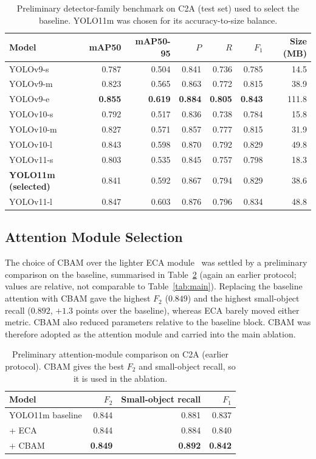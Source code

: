 \begin{table}[tbp]
  \centering
  \caption{Preliminary detector-family benchmark on C2A (test set) used to select
  the baseline. YOLO11m was chosen for its accuracy-to-size balance.}
  \label{tab:detbench}
  \setlength{\tabcolsep}{5pt}
  \begin{tabular}{@{}l r r r r r r@{}}
    \toprule
    Model & mAP50 & mAP50-95 & $P$ & $R$ & $F_1$ & Size (MB) \\
    \midrule
    YOLOv9-s   & 0.787 & 0.504 & 0.841 & 0.736 & 0.785 & 14.5 \\
    YOLOv9-m   & 0.823 & 0.565 & 0.863 & 0.772 & 0.815 & 38.9 \\
    YOLOv9-e   & \textbf{0.855} & \textbf{0.619} & \textbf{0.884} & \textbf{0.805} & \textbf{0.843} & 111.8 \\
    YOLOv10-s  & 0.792 & 0.517 & 0.836 & 0.738 & 0.784 & 15.8 \\
    YOLOv10-m  & 0.827 & 0.571 & 0.857 & 0.777 & 0.815 & 31.9 \\
    YOLOv10-l  & 0.843 & 0.598 & 0.870 & 0.792 & 0.829 & 49.8 \\
    YOLOv11-s  & 0.803 & 0.535 & 0.845 & 0.757 & 0.798 & 18.3 \\
    \textbf{YOLO11m (selected)} & 0.841 & 0.592 & 0.867 & 0.794 & 0.829 & 38.6 \\
    YOLOv11-l  & 0.847 & 0.603 & 0.876 & 0.796 & 0.834 & 48.8 \\
    \bottomrule
  \end{tabular}
\end{table}

\subsection{Attention Module Selection}
The choice of CBAM over the lighter ECA module~\cite{wang2020eca} was settled by a
preliminary comparison on the baseline, summarised in Table~\ref{tab:eca} (again an
earlier protocol; values are relative, not comparable to Table~\ref{tab:main}).
Replacing the baseline attention with CBAM gave the highest $F_2$ ($0.849$) and the
highest small-object recall ($0.892$, $+1.3$ points over the baseline), whereas ECA
barely moved either metric. CBAM also reduced parameters relative to the baseline
block. CBAM was therefore adopted as the attention module and carried into the main
ablation.

\begin{table}[tbp]
  \centering
  \caption{Preliminary attention-module comparison on C2A (earlier protocol).
  CBAM gives the best $F_2$ and small-object recall, so it is used in the ablation.}
  \label{tab:eca}
  \begin{tabular}{@{}l r r r@{}}
    \toprule
    Model & $F_2$ & Small-object recall & $F_1$ \\
    \midrule
    YOLO11m baseline & 0.844 & 0.881 & 0.837 \\
    + ECA            & 0.844 & 0.884 & 0.840 \\
    + CBAM           & \textbf{0.849} & \textbf{0.892} & \textbf{0.842} \\
    \bottomrule
  \end{tabular}
\end{table}

